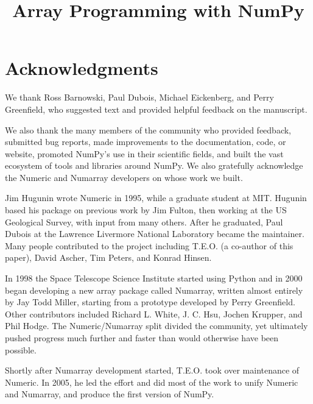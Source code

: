 \documentclass[fleqn,10pt,twocolumn]{wlscirep}
\title{Array Programming with NumPy}
\begin{document}
\flushbottom
\maketitle
\thispagestyle{empty}

%





\newpage



\section*{Acknowledgments}

We thank Ross Barnowski, Paul Dubois, Michael Eickenberg, and Perry Greenfield, who
suggested text and provided helpful feedback on the manuscript.

We also thank the many members of the community who provided
feedback, submitted bug reports, made improvements to the documentation,
code, or website, promoted NumPy's use in their scientific fields, and built
the vast ecosystem of tools and libraries around NumPy.
We also gratefully acknowledge the Numeric and Numarray developers
on whose work we built.  

Jim Hugunin wrote Numeric in 1995, while a graduate student at MIT.
Hugunin based his package on previous work by Jim Fulton, then working at the
US Geological Survey, with input from many others.
After he graduated, Paul Dubois at the Lawrence Livermore National Laboratory
became the maintainer.
Many people contributed to the project including T.E.O. (a co-author
of this paper), David Ascher, Tim Peters, and Konrad Hinsen.

In 1998 the Space Telescope Science Institute started using Python
and in 2000 began developing a new array package called Numarray, written
almost entirely by Jay Todd Miller, starting from a prototype developed by
Perry Greenfield.  Other contributors included Richard L. White, J. C. Hsu,
Jochen Krupper, and Phil Hodge.
The Numeric/Numarray split divided the community, yet ultimately pushed
progress much further and faster than would otherwise have been possible. 

Shortly after Numarray development started, T.E.O. took over maintenance of
Numeric. In 2005, he led the effort and did most of the work to unify Numeric
and Numarray, and produce the first version of NumPy.
\end{document}
